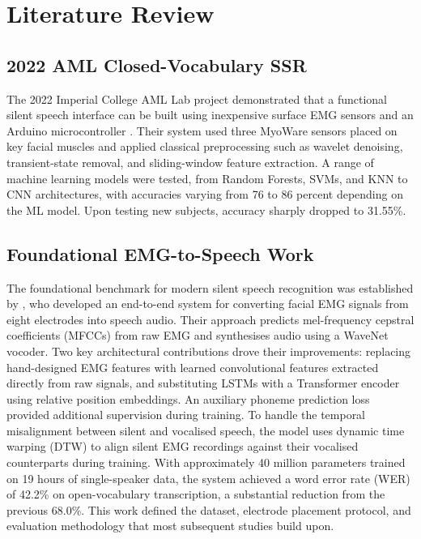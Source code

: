 \section{Literature Review}

\subsection{2022 AML Closed-Vocabulary SSR}

The 2022 Imperial College AML Lab project demonstrated that a functional silent speech interface can be built using inexpensive surface EMG sensors and an Arduino microcontroller \citep{sun2022}. Their system used three MyoWare sensors placed on key facial muscles and applied classical preprocessing such as wavelet denoising, transient-state removal, and sliding-window feature extraction. A range of machine learning models were tested, from Random Forests, SVMs, and KNN to CNN architectures, with accuracies varying from 76 to 86 percent depending on the ML model. Upon testing new subjects, accuracy sharply dropped to 31.55\%.

\subsection{Foundational EMG-to-Speech Work}

The foundational benchmark for modern silent speech recognition was established by \citet{gaddy2021}, who developed an end-to-end system for converting facial EMG signals from eight electrodes into speech audio. Their approach predicts mel-frequency cepstral coefficients (MFCCs) from raw EMG and synthesises audio using a WaveNet vocoder. Two key architectural contributions drove their improvements: replacing hand-designed EMG features with learned convolutional features extracted directly from raw signals, and substituting LSTMs with a Transformer encoder using relative position embeddings. An auxiliary phoneme prediction loss provided additional supervision during training. To handle the temporal misalignment between silent and vocalised speech, the model uses dynamic time warping (DTW) to align silent EMG recordings against their vocalised counterparts during training. With approximately 40 million parameters trained on 19 hours of single-speaker data, the system achieved a word error rate (WER) of 42.2\% on open-vocabulary transcription, a substantial reduction from the previous 68.0\%. This work defined the dataset, electrode placement protocol, and evaluation methodology that most subsequent studies build upon.

